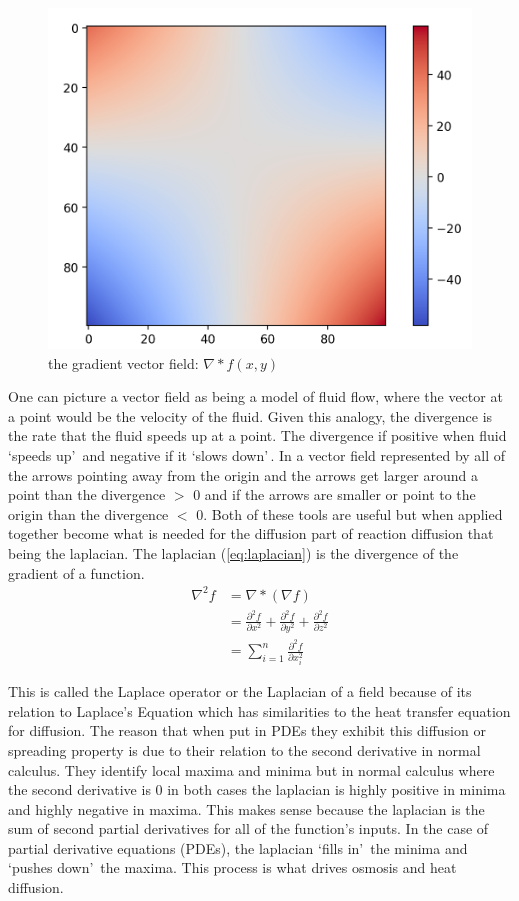 \documentclass[12pt, letterpaper]{article}
\newcommand{\sorta}[1]{\lq #1\rq \,}
\begin{document}
\begin{figure}[!h]
  \centering  
  \label{fig:div}
  \includegraphics[width=.4\linewidth]{Basics/divergence}
  \caption{the gradient vector field: $\nabla * f(x,y)$}
\end{figure}

One can picture a vector field as being a model of fluid flow, where the vector at a point would be the
velocity of the fluid. Given this analogy, the divergence is the rate that the fluid speeds up at a
point. The divergence if positive when fluid \sorta{speeds up} and negative if it \sorta{slows down}. In a
vector field represented by all of the arrows pointing away from the origin and the arrows get larger around
a point than the divergence $>$ 0 and if the arrows are smaller or point to the origin than the divergence
$<$ 0. Both of these tools are useful but when applied together become what is needed for the diffusion part
of reaction diffusion that being the laplacian. The laplacian (\ref{eq:laplacian}) is the divergence of the
gradient of a function.
\begin{equation}
  \label{eq:laplacian}
  \begin{split}
\nabla^2 f &= \nabla * (\nabla f) \\
           &= \frac{\partial^2 f}{\partial x^2} + \frac{\partial^2 f}{\partial y^2} + \frac{\partial^2
             f}{\partial z^2} \\
           &= \sum_{i=1}^{n} \frac{\partial^2 f}{\partial x_i^2}
\end{split}
\end{equation}

This is called the Laplace operator or the Laplacian of a field because of its relation to Laplace's
Equation which has similarities to the heat transfer equation for diffusion. The reason that when put in
PDEs they exhibit this diffusion or spreading property is due to their relation to the second derivative in
normal calculus. They identify local maxima and minima but in normal calculus where the second derivative is
$0$ in both cases the laplacian is highly positive in minima and highly negative in maxima. This makes sense
because the laplacian is the sum of second partial derivatives for all of the function's inputs. In the case 
of partial derivative equations (PDEs), the laplacian \sorta{fills in} the minima and \sorta{pushes down} the
maxima. This process is what drives osmosis and heat diffusion.
\end{document}
